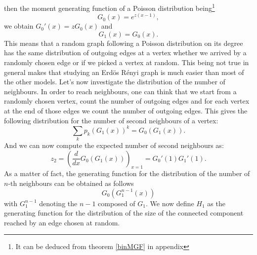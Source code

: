 then the moment generating function of a Poisson distribution being\footnote{It can be deduced from theorem \ref{binMGF} in appendix}
\begin{equation}
	G_0(x) = e^{z(x-1)},
\end{equation}
we obtain $G_0'(x) = zG_0(x)$ and
\begin{equation}
	G_1(x) = G_0(x).
\end{equation}
This means that a random graph following a Poisson distribution on its degree has the same distribution of outgoing edges at a vertex whether we arrived by a randomly chosen edge or if we picked a vertex at random.
This being not true in general makes that studying an Erd\"os R\'enyi graph is much easier than most of the other models.
\newline
Let's now investigate the distribution of the number of neighbours.
In order to reach neighbours, one can think that we start from a randomly chosen vertex, count the number of outgoing edges and for each vertex at the end of those edges we count the number of outgoing edges.
This gives the following distribution for the number of second neighbours of a vertex:
\begin{equation}
	\sum_k p_k(G_1(x))^k = G_0(G_1(x)).
\end{equation}
And we can now compute the expected number of second neighbours as:
\begin{equation}
	z_2 = (\frac{d}{dx} G_0(G_1(x)))_{x=1} = G_0'(1)G_1'(1).
\end{equation}
As a matter of fact, the generating function for the distribution of the number of $n$-th neighbours can be obtained as follows
\begin{equation}
	G_0(G_1^{n-1}(x))
\end{equation}
with $G_1^{n-1}$ denoting the $n-1$ composed of $G_1$.
\newline
We now define $H_1$ as the generating function for the distribution of the size of the connected component reached by an edge chosen at random.
